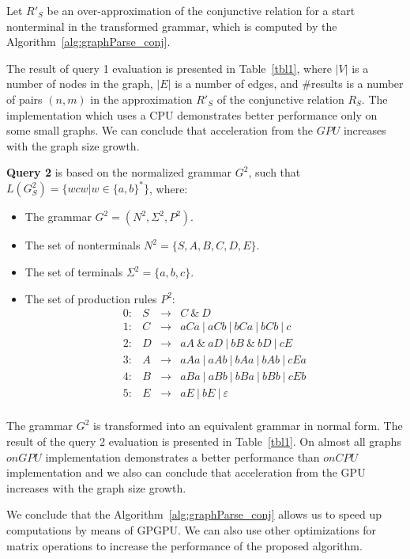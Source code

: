 Let $R'_S$ be an over-approximation of the conjunctive relation for a start nonterminal in the transformed grammar, which is computed by the Algorithm~\ref{alg:graphParse_conj}.

The result of query 1 evaluation is presented in Table~\ref{tbl1}, where $|V|$ is a number of nodes in the graph, $|E|$ is a number of edges, and \#results is a number of pairs $(n,m)$ in the approximation $R'_S$ of the conjunctive relation $R_S$. The implementation which uses a CPU demonstrates better performance only on some small graphs. We can conclude that acceleration from the $GPU$ increases with the graph size growth.

\textbf{Query 2} is based on the normalized grammar $G^2$, such that $L(G^2_S) = \{wcw | w \in \{a,b\}^*\}$, where: 
\begin{itemize}
    \item The grammar $G^2 = (N^2, \Sigma^2, P^2)$.
    \item The set of nonterminals $N^2 = \{S, A, B, C, D, E\}$.
    \item The set of terminals $\Sigma^2 = \{a, b, c\}.$
    \item The set of production rules $P^2$:
    \[
    \begin{array}{rccl}
    0: & S & \rightarrow & C ~\& ~ D \\ 
    1: & C & \rightarrow & aCa~|~aCb~|~bCa~|~bCb~|~c\\ 
    2: & D & \rightarrow & aA ~\& ~aD~|~bB ~\& ~bD~|~cE \\ 
    3: & A & \rightarrow & aAa~|~aAb~|~bAa~|~bAb~|~cEa\\ 
    4: & B & \rightarrow & aBa~|~aBb~|~bBa~|~bBb~|~cEb \\
    5: & E & \rightarrow & aE~|~bE~|~\varepsilon \\ 
    \end{array}
    \]

\end{itemize}

The grammar $G^2$ is transformed into an equivalent grammar in normal form. The result of the query 2 evaluation is presented in Table~\ref{tbl1}. On almost all graphs $onGPU$ implementation demonstrates a better performance than $onCPU$ implementation and we also can conclude that acceleration from the GPU increases with the graph size growth.

We conclude that the Algorithm~\ref{alg:graphParse_conj} allows us to speed up computations by means of GPGPU. We can also use other optimizations for matrix operations to increase the performance of the proposed algorithm.
